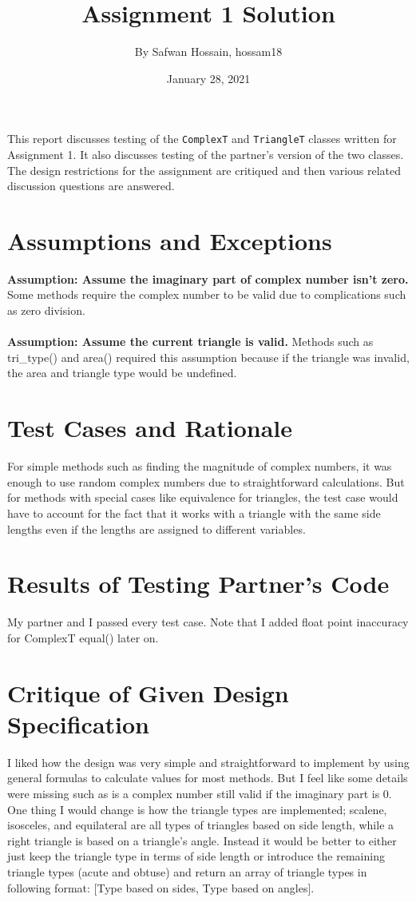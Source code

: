 \documentclass[12pt]{article}
\title{Assignment 1 Solution}
\author{By Safwan Hossain, hossam18}
\date{January 28, 2021}
\begin{document}
\maketitle

This report discusses testing of the \verb|ComplexT| and \verb|TriangleT|
classes written for Assignment 1. It also discusses testing of the partner's
version of the two classes. The design restrictions for the assignment
are critiqued and then various related discussion questions are answered.

\section{Assumptions and Exceptions} \label{AssumptAndExcept}

\textbf{Assumption: Assume the imaginary part of complex number isn’t zero.} Some methods require the complex number to be valid due to complications such as zero division. \\ \\
\textbf{Assumption: Assume the current triangle is valid.} Methods such as tri\_type() and area() required this assumption because if the triangle was invalid, the area and triangle type would be undefined.

\section{Test Cases and Rationale} \label{Testing}

For simple methods such as finding the magnitude of complex numbers, it was enough to use random complex numbers due to straightforward calculations. But for methods with special cases like equivalence for triangles, the test case would have to account for the fact that it works with a triangle with the same side lengths even if the lengths are assigned to different variables. 

\section{Results of Testing Partner's Code}

My partner and I passed every test case. Note that I added float point inaccuracy for ComplexT equal() later on.

\section{Critique of Given Design Specification}
I liked how the design was very simple and straightforward to implement by using general formulas to calculate values for most methods. But I feel like some details were missing such as is a complex number still valid if the imaginary part is 0. One thing I would change is how the triangle types are implemented; scalene, isosceles, and equilateral are all types of triangles based on side length, while a right triangle is based on a triangle’s angle. Instead it would be better to either just keep the triangle type in terms of side length or introduce the remaining triangle types (acute and obtuse) and return an array of triangle types in following format: [Type based on sides, Type based on angles].
\end{document}
